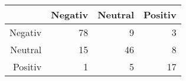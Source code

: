 \begin{table}[ht]
\centering
\begin{tabular}{rrrr}
  \hline
 & Negativ & Neutral & Positiv \\ 
  \hline
Negativ &  78 &   9 &   3 \\ 
  Neutral &  15 &  46 &   8 \\ 
  Positiv &   1 &   5 &  17 \\ 
   \hline
\end{tabular}
\end{table}

